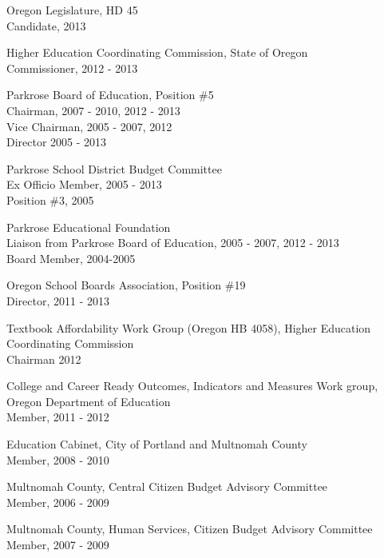 \documentclass[Computer Science]{vita}
\begin{document}
\begin{vita}
\begin{Professional and Service Activities}
    \begin{Community}
\item Oregon Legislature, HD 45\\ Candidate, 2013

\item Higher Education Coordinating Commission, State of Oregon\\
Commissioner, 2012 - 2013

    \item Parkrose Board of Education, Position \#5\\
      Chairman, 2007 - 2010, 2012 - 2013\\
      Vice Chairman, 2005 - 2007, 2012 \\
      Director 2005 - 2013

    \item Parkrose School District Budget Committee\\
      Ex Officio Member, 2005 - 2013\\
      Position \#3, 2005

\item Parkrose Educational Foundation\\
      Liaison from Parkrose Board of Education, 2005 - 2007, 2012 - 2013\\
      Board Member, 2004-2005


    \item Oregon School Boards Association, Position \#19\\
    Director, 2011 - 2013

  \item Textbook Affordability Work Group (Oregon HB 4058), Higher Education Coordinating Commission\\ Chairman 2012

\item College and Career Ready Outcomes, Indicators and Measures Work group, Oregon Department of Education\\
Member, 2011 -  2012

    \item  Education Cabinet, City of Portland and Multnomah County\\
      Member, 2008 - 2010

    \item Multnomah County, Central Citizen Budget Advisory Committee\\
      Member, 2006 - 2009

    \item Multnomah County, Human Services, Citizen Budget Advisory
      Committee\\Member, 2007 - 2009


\end{Community}
\end{Professional and Service Activities}
\end{vita}
\end{document}
